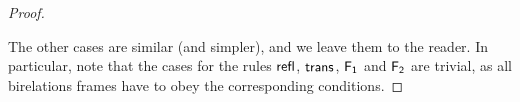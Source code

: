 \begin{proof}
\begin{itemize}
	\end{itemize}
	The other cases are similar (and simpler), and we leave them to the
	reader. In particular, note that the cases for the rules $\mathsf{refl}$,
	$\mathsf{trans}$, $\mathsf{F_1}$ and $\mathsf{F_2}$ are trivial, as all
	birelations frames have to obey the corresponding conditions.
\end{proof}






